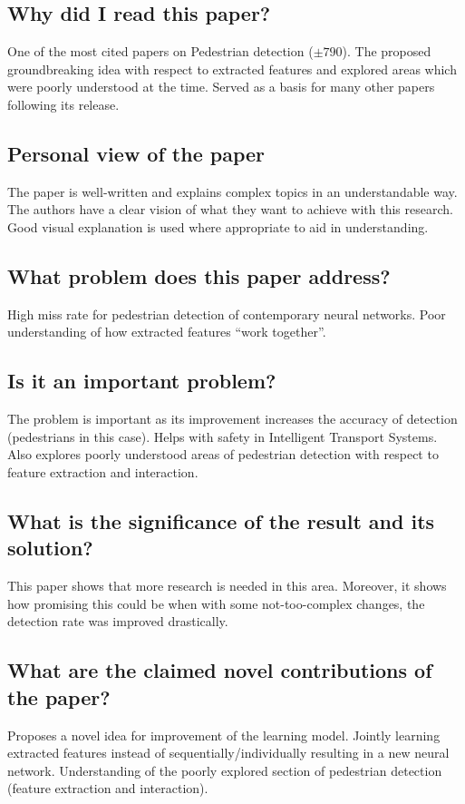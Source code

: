 \documentclass[11pt,a4paper]{article}
\begin{document}
\subsection*{Why did I read this paper?}
One of the most cited papers on Pedestrian detection ($\pm790$). The proposed groundbreaking idea with respect to extracted features and explored areas which were poorly understood at the time. Served as a basis for many other papers following its release.

\subsection*{Personal view of the paper}
The paper is well-written and explains complex topics in an understandable way. The authors have a clear vision of what they want to achieve with this research. Good visual explanation is used where appropriate to aid in understanding.

\subsection*{What problem does this paper address?}
High miss rate for pedestrian detection of contemporary neural networks. Poor understanding of how extracted features “work together”.

\subsection*{Is it an important problem?}
The problem is important as its improvement increases the accuracy of detection (pedestrians in this case). Helps with safety in Intelligent Transport Systems. Also explores poorly understood areas of pedestrian detection with respect to feature extraction and interaction.

\subsection*{What is the significance of the result and its solution?}
This paper shows that more research is needed in this area. Moreover, it shows how promising this could be when with some not-too-complex changes, the detection rate was improved drastically.

\subsection*{What are the claimed novel contributions of the paper?}
Proposes a novel idea for improvement of the learning model. Jointly learning extracted features instead of sequentially/individually resulting in a new neural network. Understanding of the poorly explored section of pedestrian detection (feature extraction and interaction).
\end{document}
